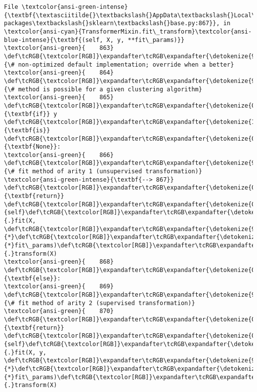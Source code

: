 \documentclass[11pt]{article}
\begin{document}
\begin{Verbatim}[commandchars=\\\{\}, frame=single, framerule=2mm, rulecolor=\color{outerrorbackground}]
File \textcolor{ansi-green-intense}{\textbf{\textasciitilde{}\textbackslash{}AppData\textbackslash{}Local\textbackslash{}Programs\textbackslash{}Python\textbackslash{}Python310\textbackslash{}lib\textbackslash{}site-packages\textbackslash{}sklearn\textbackslash{}base.py:867}}, in \textcolor{ansi-cyan}{TransformerMixin.fit\_transform}\textcolor{ansi-blue-intense}{\textbf{(self, X, y, **fit\_params)}}
\textcolor{ansi-green}{    863} \def\tcRGB{\textcolor[RGB]}\expandafter\tcRGB\expandafter{\detokenize{95,135,135}}{\# non-optimized default implementation; override when a better}
\textcolor{ansi-green}{    864} \def\tcRGB{\textcolor[RGB]}\expandafter\tcRGB\expandafter{\detokenize{95,135,135}}{\# method is possible for a given clustering algorithm}
\textcolor{ansi-green}{    865} \def\tcRGB{\textcolor[RGB]}\expandafter\tcRGB\expandafter{\detokenize{0,135,0}}{\textbf{if}} y \def\tcRGB{\textcolor[RGB]}\expandafter\tcRGB\expandafter{\detokenize{175,0,255}}{\textbf{is}} \def\tcRGB{\textcolor[RGB]}\expandafter\tcRGB\expandafter{\detokenize{0,135,0}}{\textbf{None}}:
\textcolor{ansi-green}{    866}     \def\tcRGB{\textcolor[RGB]}\expandafter\tcRGB\expandafter{\detokenize{95,135,135}}{\# fit method of arity 1 (unsupervised transformation)}
\textcolor{ansi-green-intense}{\textbf{--> 867}}     \def\tcRGB{\textcolor[RGB]}\expandafter\tcRGB\expandafter{\detokenize{0,135,0}}{\textbf{return}} \def\tcRGB{\textcolor[RGB]}\expandafter\tcRGB\expandafter{\detokenize{0,135,0}}{self}\def\tcRGB{\textcolor[RGB]}\expandafter\tcRGB\expandafter{\detokenize{98,98,98}}{.}fit(X, \def\tcRGB{\textcolor[RGB]}\expandafter\tcRGB\expandafter{\detokenize{98,98,98}}{*}\def\tcRGB{\textcolor[RGB]}\expandafter\tcRGB\expandafter{\detokenize{98,98,98}}{*}fit\_params)\def\tcRGB{\textcolor[RGB]}\expandafter\tcRGB\expandafter{\detokenize{98,98,98}}{.}transform(X)
\textcolor{ansi-green}{    868} \def\tcRGB{\textcolor[RGB]}\expandafter\tcRGB\expandafter{\detokenize{0,135,0}}{\textbf{else}}:
\textcolor{ansi-green}{    869}     \def\tcRGB{\textcolor[RGB]}\expandafter\tcRGB\expandafter{\detokenize{95,135,135}}{\# fit method of arity 2 (supervised transformation)}
\textcolor{ansi-green}{    870}     \def\tcRGB{\textcolor[RGB]}\expandafter\tcRGB\expandafter{\detokenize{0,135,0}}{\textbf{return}} \def\tcRGB{\textcolor[RGB]}\expandafter\tcRGB\expandafter{\detokenize{0,135,0}}{self}\def\tcRGB{\textcolor[RGB]}\expandafter\tcRGB\expandafter{\detokenize{98,98,98}}{.}fit(X, y, \def\tcRGB{\textcolor[RGB]}\expandafter\tcRGB\expandafter{\detokenize{98,98,98}}{*}\def\tcRGB{\textcolor[RGB]}\expandafter\tcRGB\expandafter{\detokenize{98,98,98}}{*}fit\_params)\def\tcRGB{\textcolor[RGB]}\expandafter\tcRGB\expandafter{\detokenize{98,98,98}}{.}transform(X)


\end{Verbatim}
\end{document}
